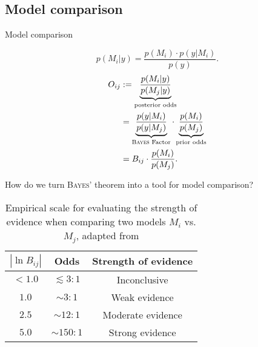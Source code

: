 \documentclass[11pt,aspectratio=1610,dvipsnames]{beamer}
\begin{document}
\subsection{Model comparison}
\begin{frame}{Model comparison}

	
	\begin{minipage}{.48\linewidth}
		\begin{tcolorbox}[colback=black!5,colframe=gray!15!black,title=\textsc{Bayes} factor] 
			\begin{equation}
			p(M_i|y)=\frac{p(M_i)\cdot p(y|M_i)}{p(y)}.
			\end{equation}
			\begin{align}\label{eq:bf}
			\begin{split}
			O_{ij}&:=\underbrace{\frac{p(M_i|y)}{p(M_j|y)}}_{\text{posterior odds}}\\&=\underbrace{\frac{p(y|M_i)}{p(y|M_j)}}_{\text{\textsc{Bayes} Factor}}\cdot\underbrace{\frac{p(M_i)}{p(M_j)}}_{\text{prior odds}}\\&=B_{ij}\cdot\frac{p(M_i)}{p(M_j)}.
			\end{split}
			\end{align}
		\end{tcolorbox}
	\end{minipage}
\hfil
\begin{minipage}{.45\linewidth}
		How do we turn \textsc{Bayes'} theorem into a tool for model comparison?
	\begin{table}[htbp]
		
		\centering
		{\renewcommand{\arraystretch}{1.3}
			\begin{tabular}{|c|c|c|}
				\hline
				$|\ln B_{ij}|$& Odds  & Strength of evidence \\
				\hline
				$< 1.0$& $ \lesssim 3:1$  & Inconclusive  \\
				$1.0$ & $\sim 3:1$  & Weak evidence  \\
				$2.5$& $\sim 12:1$  & Moderate evidence \\
				$5.0$& $\sim 150:1$ & Strong evidence \\
				\hline
		\end{tabular}}
		\caption{Empirical scale for evaluating the strength of evidence when comparing two models $M_i$ vs. $M_j$, adapted from \citet{Trotta_2008}}
		\label{tab:bf}
	\end{table}
\raggedleft
\citet{Trotta_2008}
\end{minipage}
	




\end{frame}
\end{document}
